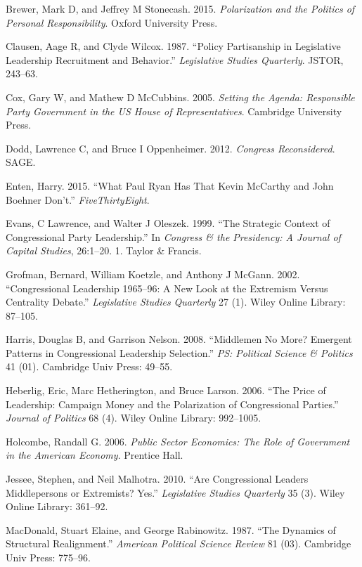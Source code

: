 \documentclass[12pt,twoside]{reedthesis}
\begin{document}
  \noindent
  
  \setlength{\parindent}{-0.20in} \setlength{\leftskip}{0.20in}
  \setlength{\parskip}{8pt}
  
  Brewer, Mark D, and Jeffrey M Stonecash. 2015. \emph{Polarization and
  the Politics of Personal Responsibility}. Oxford University Press.
  
  Clausen, Aage R, and Clyde Wilcox. 1987. ``Policy Partisanship in
  Legislative Leadership Recruitment and Behavior.'' \emph{Legislative
  Studies Quarterly}. JSTOR, 243--63.
  
  Cox, Gary W, and Mathew D McCubbins. 2005. \emph{Setting the Agenda:
  Responsible Party Government in the US House of Representatives}.
  Cambridge University Press.
  
  Dodd, Lawrence C, and Bruce I Oppenheimer. 2012. \emph{Congress
  Reconsidered}. SAGE.
  
  Enten, Harry. 2015. ``What Paul Ryan Has That Kevin McCarthy and John
  Boehner Don't.'' \emph{FiveThirtyEight}.
  
  Evans, C Lawrence, and Walter J Oleszek. 1999. ``The Strategic Context
  of Congressional Party Leadership.'' In \emph{Congress \& the
  Presidency: A Journal of Capital Studies}, 26:1--20. 1. Taylor \&
  Francis.
  
  Grofman, Bernard, William Koetzle, and Anthony J McGann. 2002.
  ``Congressional Leadership 1965--96: A New Look at the Extremism Versus
  Centrality Debate.'' \emph{Legislative Studies Quarterly} 27 (1). Wiley
  Online Library: 87--105.
  
  Harris, Douglas B, and Garrison Nelson. 2008. ``Middlemen No More?
  Emergent Patterns in Congressional Leadership Selection.'' \emph{PS:
  Political Science \& Politics} 41 (01). Cambridge Univ Press: 49--55.
  
  Heberlig, Eric, Marc Hetherington, and Bruce Larson. 2006. ``The Price
  of Leadership: Campaign Money and the Polarization of Congressional
  Parties.'' \emph{Journal of Politics} 68 (4). Wiley Online Library:
  992--1005.
  
  Holcombe, Randall G. 2006. \emph{Public Sector Economics: The Role of
  Government in the American Economy}. Prentice Hall.
  
  Jessee, Stephen, and Neil Malhotra. 2010. ``Are Congressional Leaders
  Middlepersons or Extremists? Yes.'' \emph{Legislative Studies Quarterly}
  35 (3). Wiley Online Library: 361--92.
  
  MacDonald, Stuart Elaine, and George Rabinowitz. 1987. ``The Dynamics of
  Structural Realignment.'' \emph{American Political Science Review} 81
  (03). Cambridge Univ Press: 775--96.
  
\end{document}

